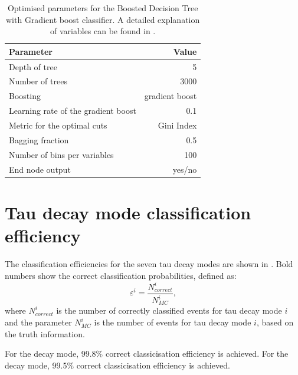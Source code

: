 


\begin{table}[!htbp]\centering
\begin{tabular}{lr}
\hline \hline
 Parameter &  Value \\
\hline
Depth of tree & 5 \\
Number of trees & 3000 \\
Boosting & gradient boost \\
Learning rate of the gradient boost & 0.1 \\
Metric for the optimal cuts & Gini Index \\
Bagging fraction & 0.5 \\
Number of bins per variables & 100 \\
End node output & yes/no \\
\hline \hline
\end{tabular}

\caption
{Optimised parameters for the Boosted Decision Tree with Gradient boost \multiclass classifier. A detailed explanation of variables can be found in .}
\label{tab:tauBDTparameters}
\end{table}


\section{Tau decay mode classification efficiency}
\label{sec:tauClassificationEff}
The classification efficiencies for the seven tau decay modes are shown in . Bold numbers show the correct classification probabilities, defined as:
\begin{equation}
\varepsilon^i = \frac{N_{correct}^i}{N_{MC}^i},
\label{eqn:tauEff}
\end{equation}
where $N_{correct}^i$ is the number of correctly classified events for tau decay mode $i$ and the parameter $N_{MC}^i$ is the number of events for tau decay mode $i$, based on the truth information.

For the \decayElectronShort decay mode,   99.8\%  correct classicisation efficiency is achieved. For the \decayMuonShort decay mode,  99.5\% correct classicisation efficiency is achieved.

